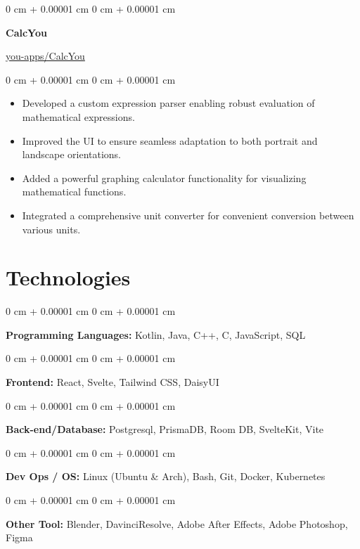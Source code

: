 \documentclass[10pt, letterpaper]{article}
\newenvironment{highlights}{
	\begin{itemize}[
		topsep=0.10 cm,
		parsep=0.10 cm,
		partopsep=0pt,
		itemsep=0pt,
		leftmargin=0 cm + 10pt
		]
	}{
	\end{itemize}
} %
\newenvironment{onecolentry}{
	\begin{adjustwidth}{
			0 cm + 0.00001 cm
		}{
			0 cm + 0.00001 cm
		}
	}{
	\end{adjustwidth}
} %
\newenvironment{twocolentry}[2][]{
	\onecolentry
	\def\secondColumn{#2}
	\setcolumnwidth{\fill, 4.5 cm}
	\begin{paracol}{2}
	}{
		\switchcolumn \raggedleft \secondColumn
	\end{paracol}
	\endonecolentry
} %
\begin{document}
	\vspace{0.2 cm}
	
				\begin{twocolentry}{\href{https://github.com/you-apps/CalcYou}{you-apps/CalcYou}}
		\textbf{CalcYou}
	\end{twocolentry}
	\vspace{0.10 cm}
	\begin{onecolentry}
		\begin{highlights}
			\item Developed a custom expression parser enabling robust evaluation of mathematical expressions.
			\item Improved the UI to ensure seamless adaptation to both portrait and landscape orientations.
			\item Added a powerful graphing calculator functionality for visualizing mathematical functions.
			\item Integrated a comprehensive unit converter for convenient conversion between various units.
		\end{highlights}
	\end{onecolentry}
	
	\vspace{0.2 cm}
	
	\section{Technologies}
	\begin{onecolentry}
		\textbf{Programming Languages:} Kotlin, Java, C++, C, JavaScript, SQL
	\end{onecolentry}
	
	\vspace{0.2 cm}
	
	\begin{onecolentry}
		\textbf{Frontend:} React, Svelte, Tailwind CSS, DaisyUI
	\end{onecolentry}
	
	\vspace{0.2 cm}
	
	\begin{onecolentry}
		\textbf{Back-end/Database:} Postgresql, PrismaDB, Room DB, SvelteKit, Vite
	\end{onecolentry}
	
	\vspace{0.2 cm}
	
	\begin{onecolentry}
		\textbf{Dev Ops / OS:} Linux (Ubuntu \& Arch), Bash, Git, Docker, Kubernetes
	\end{onecolentry}
	
	\vspace{0.2 cm}
	
	\begin{onecolentry}
		\textbf{Other Tool:} Blender, DavinciResolve, Adobe After Effects, Adobe Photoshop, Figma
	\end{onecolentry}
	
\end{document}
